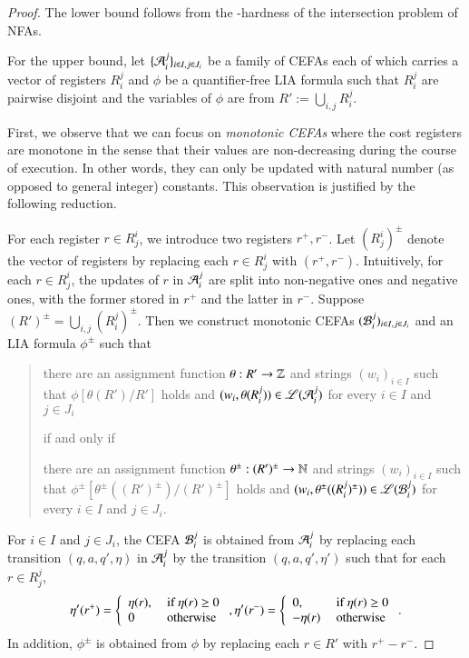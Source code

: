 \begin{proof}
	The lower bound follows from the {\pspace}-hardness of the intersection problem of NFAs. 
	
	For the upper bound, let $\{ \mathcal{A}_i^{j} \}_{i\in I,j\in J_i}$ be a family of CEFAs  each of which carries a vector of registers $R_i^j$ and  $\phi$ be a quantifier-free LIA formula such that  $ R_i^{j} $ are pairwise disjoint and the variables of $\phi$ are from $R':=\bigcup_{i,j} R_i^j$. 
	
	First, we observe that we can focus on \emph{monotonic CEFAs} where the cost registers are monotone in the sense that their values are non-decreasing during the course of execution. In other words, they can only be updated with natural number (as opposed to general integer) constants. This observation is justified by the following reduction.
	
	For each register $r \in R^i_j$, we introduce two registers $r^+, r^-$. Let $(R^i_j)^{\pm}$ denote the vector of registers by replacing each $r \in R^i_j$ with $(r^+, r^-)$. Intuitively,  for each $r \in R^i_j$, the updates of $r$ in $\mathcal{A}_i^{j} $ are split into non-negative ones and negative ones, with the former stored in $r^+$ and the latter in $r^-$. Suppose $(R')^{\pm} = \bigcup_{i,j} (R_i^j)^{\pm}$. Then we construct monotonic CEFAs $(\mathcal{B}_i^{j})_{i \in I, j \in J_i}$ and an LIA formula $\phi^\pm$ such that
	\begin{quote}
		there are an assignment function $\theta: R' \rightarrow \mathbb{Z}$ and strings $(w_i)_{i \in I}$ such that  $\phi[\theta(R' )/R']$ holds and $(w_i, \theta(R_i^j)) \in \mathscr{L}(\mathcal{A}_{i}^j)$ for every $i \in I$ and $j \in J_i$ 
		\begin{center} if and only if \end{center}
		there are an assignment function $\theta^\pm: (R')^\pm \rightarrow \mathbb{N}$ and strings $(w_i)_{i \in I}$ such that  $\phi^\pm[\theta^\pm((R')^\pm)/(R')^\pm]$ holds and $(w_i, \theta^\pm((R_i^j)^\pm)) \in \mathscr{L}(\mathcal{B}_{i}^j)$ for every $i \in I$ and $j \in J_i$.
	\end{quote}
	For $i \in I$ and $j \in J_i$, the CEFA $\mathcal{B}_{i}^j$ is obtained from $\mathcal{A}_{i}^j$ by replacing each transition $(q, a, q', \eta)$ in $\mathcal{A}_i^j$ by the transition $(q, a, q', \eta')$ such that for each $r \in R_j^j$, 
	\[
	\eta'(r^+) = \left\{ \begin{array}{l  l}\eta(r), & \mbox{ if } \eta(r) \ge 0 \\ 0 & \mbox{ otherwise} \end{array}\right.,  \eta'(r^-) = \left\{ \begin{array}{l  l} 0, & \mbox{ if } \eta(r) \ge 0 \\ -\eta(r) & \mbox{ otherwise} \end{array}\right..
	\]
	In addition, $\phi^\pm$ is obtained from $\phi$ by replacing each $r \in R'$ with $r^+-r^-$.
	

\end{proof}
